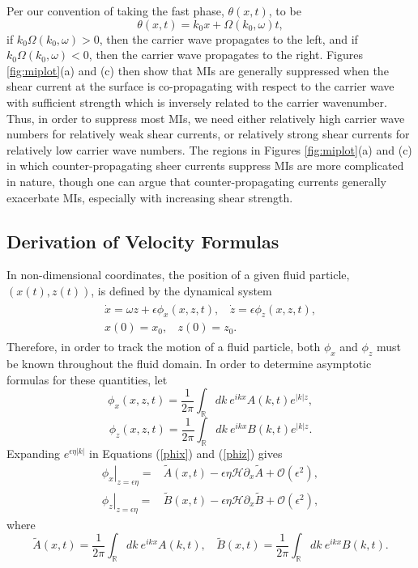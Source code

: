 \documentclass{JFM_Style/jfm}
\newcommand{\pd}{\partial}
\begin{document}
Per our convention of taking the fast phase, $\theta(x,t)$, to be
\[
\theta(x,t) = k_{0}x + \Omega(k_{0},\omega) t,
\]
if $k_{0}\Omega(k_{0},\omega)>0$, then the carrier wave propagates to the left, and if $k_0 \Omega(k_{0},\omega)<0$, then the carrier wave propagates to the right.  Figures \ref{fig:miplot}(a) and (c) then show that MIs are generally suppressed when the shear current at the surface is co-propagating with respect to the carrier wave with sufficient strength which is inversely related to the carrier wavenumber.  Thus, in order to suppress most MIs, we need either relatively high carrier wave numbers for relatively weak shear currents, or relatively strong shear currents for relatively low carrier wave numbers.  The regions in Figures \ref{fig:miplot}(a) and (c) in which counter-propagating sheer currents suppress MIs are more complicated in nature, though one can argue that counter-propagating currents generally exacerbate MIs, especially with increasing shear strength.
\subsection{Derivation of Velocity Formulas}
In non-dimensional coordinates, the position of a given fluid particle, $(x(t),z(t))$, is defined by the dynamical system
\begin{align}
\begin{split}
\dot{x} = \omega z + \epsilon \phi_{x}(x,z,t), ~~~~ \dot{z} = \epsilon\phi_{z}(x,z,t),\\
x(0) =x_0,~~~~ z(0)=z_0.
\end{split}
\label{system}
\end{align}
Therefore, in order to track the motion of a fluid particle, both $\phi_x$ and $\phi_z$ must be known throughout the fluid domain.  In order to determine asymptotic formulas for these quantities, let
\begin{equation}
\phi_{x}(x,z,t) = \frac{1}{2\pi}\int_{\mathbb{R}}dk~ e^{ikx} A(k,t)e^{|k|z},
\label{phix}
\end{equation}
\begin{equation}
\phi_{z}(x,z,t) = \frac{1}{2\pi}\int_{\mathbb{R}}dk~ e^{ikx} B(k,t)e^{|k|z}.
\label{phiz}
\end{equation}
Expanding $e^{\epsilon \eta |k|}$ in Equations (\ref{phix}) and (\ref{phiz}) gives
\begin{align}
\left.\phi_{x}\right|_{z=\epsilon\eta} = & \tilde{A}(x,t) - \epsilon\eta\mathcal{H}\pd_{x}\tilde{A} +\mathcal{O}(\epsilon^{2}),\label{phixsurfsol}\\
\left.\phi_{z}\right|_{z=\epsilon\eta} = & \tilde{B}(x,t) - \epsilon\eta\mathcal{H}\pd_{x}\tilde{B} +\mathcal{O}(\epsilon^{2}),\label{phizsurfsol}
\end{align}
where
\[
\tilde{A}(x,t) = \frac{1}{2\pi}\int_{\mathbb{R}}dk~ e^{ikx} A(k,t), ~~~~ \tilde{B}(x,t) = \frac{1}{2\pi}\int_{\mathbb{R}}dk~ e^{ikx} B(k,t).
\]
\end{document}

